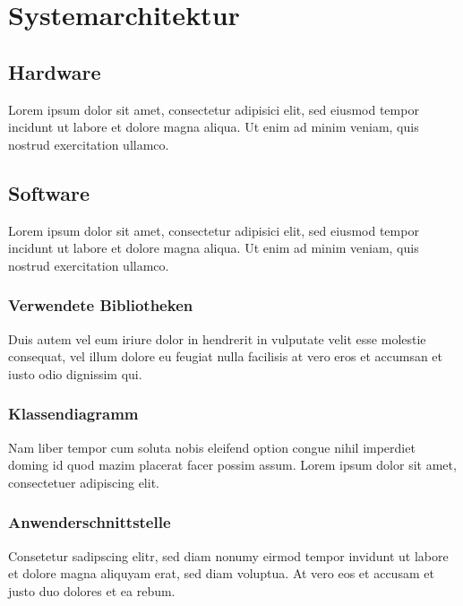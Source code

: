 \chapter{Systemarchitektur}



\section{Hardware}
Lorem ipsum dolor sit amet, consectetur adipisici elit, sed eiusmod tempor incidunt ut labore et dolore magna aliqua. Ut enim ad minim veniam, quis nostrud exercitation ullamco.

\section{Software}
Lorem ipsum dolor sit amet, consectetur adipisici elit, sed eiusmod tempor incidunt ut labore et dolore magna aliqua. Ut enim ad minim veniam, quis nostrud exercitation ullamco.

\subsection{Verwendete Bibliotheken}
Duis autem vel eum iriure dolor in hendrerit in vulputate velit esse molestie consequat, vel illum dolore eu feugiat nulla facilisis at vero eros et accumsan et iusto odio dignissim qui.

\subsection{Klassendiagramm}
Nam liber tempor cum soluta nobis eleifend option congue nihil imperdiet doming id quod mazim placerat facer possim assum. Lorem ipsum dolor sit amet, consectetuer adipiscing elit.

\subsection{Anwenderschnittstelle}
Consetetur sadipscing elitr, sed diam nonumy eirmod tempor invidunt ut labore et dolore magna aliquyam erat, sed diam voluptua. At vero eos et accusam et justo duo dolores et ea rebum.












%